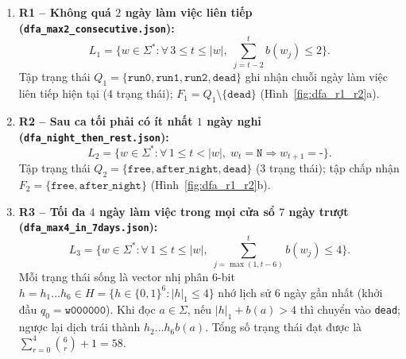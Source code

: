 \begin{enumerate}
    \item \textbf{R1 -- Không quá $2$ ngày làm việc liên tiếp (\texttt{dfa\_\allowbreak max2\_\allowbreak consecutive.json}):}
    \begin{equation*}
        L_1 = \Big\{ w \in \Sigma^* : \forall \, 3 \le t \le |w|, \; \sum_{j=t-2}^{t} b(w_j) \le 2 \Big\}.
    \end{equation*}
    Tập trạng thái $Q_1 = \{\texttt{run0},\allowbreak \texttt{run1},\allowbreak \texttt{run2},\allowbreak \texttt{dead}\}$ ghi nhận chuỗi ngày làm việc liên tiếp hiện tại ($4$ trạng thái); $F_1 = Q_1 \setminus \{\texttt{dead}\}$ (Hình~\ref{fig:dfa_r1_r2}a).

    \item \textbf{R2 -- Sau ca tối phải có ít nhất $1$ ngày nghỉ (\texttt{dfa\_\allowbreak night\_\allowbreak then\_\allowbreak rest.json}):}
    \begin{equation*}
        L_2 = \{ w \in \Sigma^* : \forall \, 1 \le t < |w|, \; w_t = \texttt{N} \Rightarrow w_{t+1} = \texttt{-} \}.
    \end{equation*}
    Tập trạng thái $Q_2 = \{\texttt{free},\allowbreak \texttt{after\_night},\allowbreak \texttt{dead}\}$ ($3$ trạng thái); tập chấp nhận $F_2 = \{\texttt{free},\allowbreak \texttt{after\_night}\}$ (Hình~\ref{fig:dfa_r1_r2}b).

    \item \textbf{R3 -- Tối đa $4$ ngày làm việc trong mọi cửa sổ $7$ ngày trượt (\texttt{dfa\_\allowbreak max4\_\allowbreak in\_\allowbreak 7days.json}):}
    \begin{equation*}
        L_3 = \Big\{ w \in \Sigma^* : \forall \, 1 \le t \le |w|, \; \sum_{j=\max(1, t-6)}^{t} b(w_j) \le 4 \Big\}.
    \end{equation*}
    Mỗi trạng thái sống là vector nhị phân $6$-bit $h = h_1\dots h_6 \in H = \{h \in \{0,1\}^6 : |h|_1 \le 4\}$ nhớ lịch sử $6$ ngày gần nhất (khởi đầu $q_0 = \texttt{w000000}$). Khi đọc $a \in \Sigma$, nếu $|h|_1 + b(a) > 4$ thì chuyển vào \texttt{dead}; ngược lại dịch trái thành $h_2\dots h_6 b(a)$. Tổng số trạng thái đạt được là $\sum_{r=0}^4 \binom{6}{r} + 1 = 58$.
\end{enumerate}


